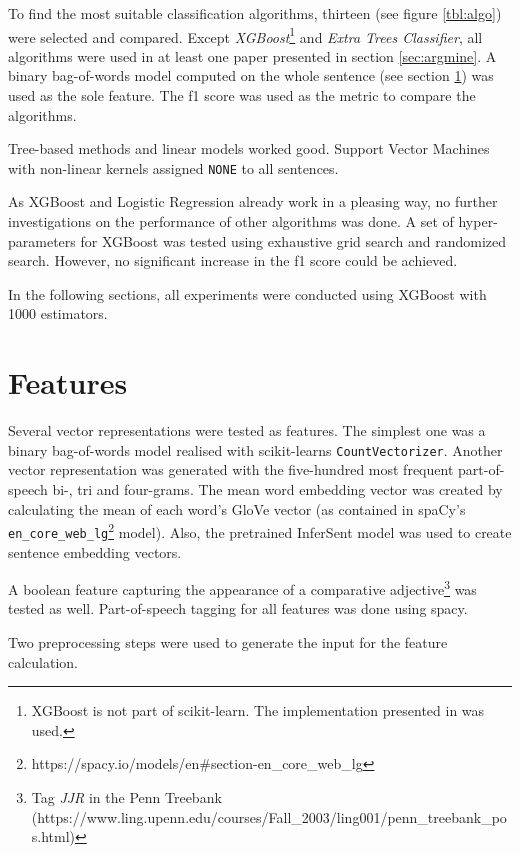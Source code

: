 To find the most suitable classification algorithms, thirteen (see figure \ref{tbl:algo}) were selected and compared. Except \emph{XGBoost}\footnote{XGBoost is not part of scikit-learn. The implementation presented in \cite{DBLP:journals/corr/ChenG16} was used.} and \emph{Extra Trees Classifier}, all algorithms were used in at least one paper presented in section \ref{sec:argmine}. A binary bag-of-words model computed on the whole sentence (see section \ref{sec:features}) was used as the sole feature. The f1 score was used as the metric to compare the algorithms. 

Tree-based methods and linear models worked good. Support Vector Machines with non-linear kernels assigned \texttt{NONE} to all sentences.

As XGBoost and Logistic Regression already work in a pleasing way, no further investigations on the performance of other algorithms was done. A set of hyper-parameters for XGBoost was tested using exhaustive grid search and randomized search. However, no significant increase in the f1 score could be achieved.

In the following sections, all experiments were conducted using XGBoost with 1000 estimators.


\section{Features}
\label{sec:features}
Several vector representations were tested as features. The simplest one was a binary bag-of-words model realised with scikit-learns \texttt{CountVectorizer}. Another vector representation was generated with the five-hundred most frequent part-of-speech bi-, tri and four-grams. The mean word embedding vector was created by calculating the mean of each word's GloVe vector (as contained in spaCy's \texttt{en\_core\_web\_lg}\footnote{https://spacy.io/models/en\#section-en\_core\_web\_lg} model). Also, the pretrained InferSent model was used to create sentence embedding vectors.

A boolean feature capturing the appearance of a comparative adjective\footnote{Tag \emph{JJR} in the Penn Treebank (https://www.ling.upenn.edu/courses/Fall\_2003/ling001/penn\_treebank\_pos.html)} was tested as well. Part-of-speech tagging for all features was done using spacy.\newline

Two preprocessing steps were used to generate the input for the feature calculation.

